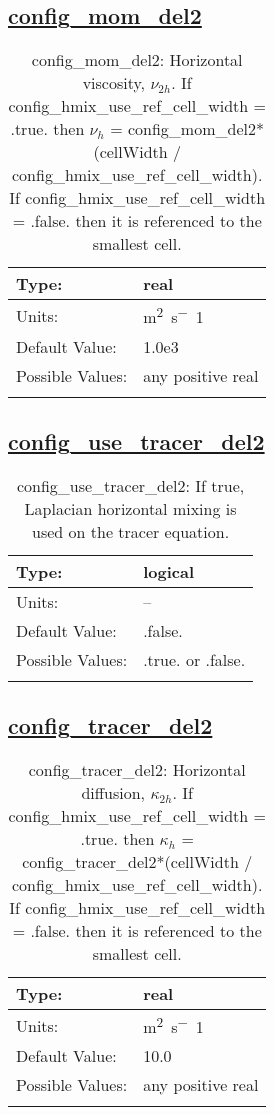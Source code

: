 \subsection[config\_mom\_del2]{\hyperref[sec:nm_tab_hmix_del2]{config\_mom\_del2}}
\label{subsec:nm_sec_config_mom_del2}
\begin{center}
\begin{longtable}{| p{2.0in} || p{4.0in} |}
    \hline
    Type: & real \\
    \hline
    Units: & \si{m^2.s^-1} \\
    \hline
    Default Value: & 1.0e3 \\
    \hline
    Possible Values: & any positive real \\
    \hline
    \caption{config\_mom\_del2: Horizontal viscosity, $\nu_{2h}$. If config\_hmix\_use\_ref\_cell\_width = .true. then $\nu_h$ = config\_mom\_del2*(cellWidth / config\_hmix\_use\_ref\_cell\_width). If config\_hmix\_use\_ref\_cell\_width = .false. then it is referenced to the smallest cell.}
\end{longtable}
\end{center}
\subsection[config\_use\_tracer\_del2]{\hyperref[sec:nm_tab_hmix_del2]{config\_use\_tracer\_del2}}
\label{subsec:nm_sec_config_use_tracer_del2}
\begin{center}
\begin{longtable}{| p{2.0in} || p{4.0in} |}
    \hline
    Type: & logical \\
    \hline
    Units: & -- \\
    \hline
    Default Value: & .false. \\
    \hline
    Possible Values: & .true. or .false. \\
    \hline
    \caption{config\_use\_tracer\_del2: If true, Laplacian horizontal mixing is used on the tracer equation.}
\end{longtable}
\end{center}
\subsection[config\_tracer\_del2]{\hyperref[sec:nm_tab_hmix_del2]{config\_tracer\_del2}}
\label{subsec:nm_sec_config_tracer_del2}
\begin{center}
\begin{longtable}{| p{2.0in} || p{4.0in} |}
    \hline
    Type: & real \\
    \hline
    Units: & \si{m^2.s^-1} \\
    \hline
    Default Value: & 10.0 \\
    \hline
    Possible Values: & any positive real \\
    \hline
    \caption{config\_tracer\_del2: Horizontal diffusion, $\kappa_{2h}$. If config\_hmix\_use\_ref\_cell\_width = .true. then $\kappa_h$ = config\_tracer\_del2*(cellWidth / config\_hmix\_use\_ref\_cell\_width). If config\_hmix\_use\_ref\_cell\_width = .false. then it is referenced to the smallest cell.}
\end{longtable}
\end{center}
